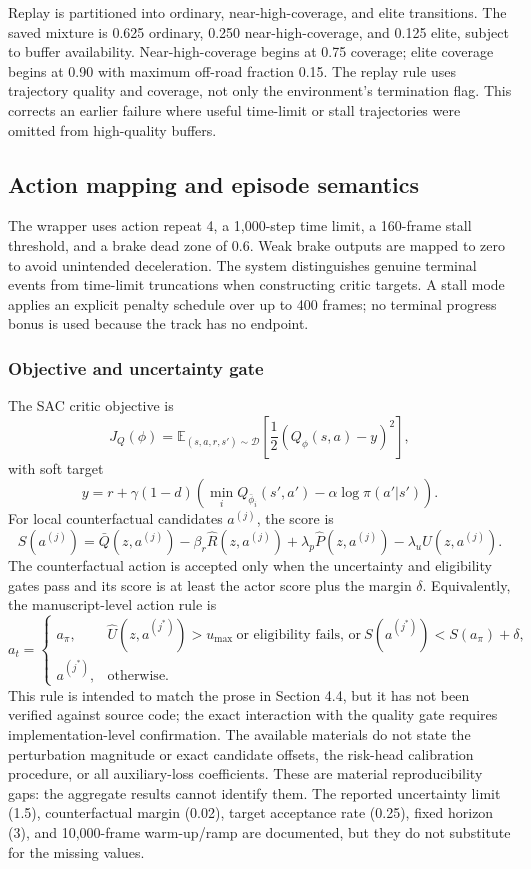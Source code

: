 \documentclass[11pt]{article}
\begin{document}
Replay is partitioned into ordinary, near-high-coverage, and elite
transitions. The saved mixture is 0.625 ordinary, 0.250
near-high-coverage, and 0.125 elite, subject to buffer availability.
Near-high-coverage begins at 0.75 coverage; elite coverage begins at
0.90 with maximum off-road fraction 0.15. The replay rule uses
trajectory quality and coverage, not only the environment's termination
flag. This corrects an earlier failure where useful time-limit or stall
trajectories were omitted from high-quality buffers.

\subsection{Action mapping and episode
semantics}\label{action-mapping-and-episode-semantics}

The wrapper uses action repeat 4, a 1,000-step time limit, a 160-frame
stall threshold, and a brake dead zone of 0.6. Weak brake outputs are
mapped to zero to avoid unintended deceleration. The system
distinguishes genuine terminal events from time-limit truncations when
constructing critic targets. A stall mode applies an explicit penalty
schedule over up to 400 frames; no terminal progress bonus is used
because the track has no endpoint.

\subsubsection{Objective and uncertainty
gate}\label{objective-and-uncertainty-gate}

The SAC critic objective is \[
J_Q(\phi)=\mathbb{E}_{(s,a,r,s')\sim\mathcal D}
\left[\frac12\left(Q_\phi(s,a)-y\right)^2\right],
\] with soft target \[
y=r+\gamma(1-d)\left(\min_i Q_{\bar\phi_i}(s',a')-\alpha\log\pi(a'|s')\right).
\] For local counterfactual candidates \(a^{(j)}\), the score is \[
S(a^{(j)})=\bar Q(z,a^{(j)})-\beta_r\hat R(z,a^{(j)})
+\lambda_p\hat P(z,a^{(j)})-\lambda_u\hat U(z,a^{(j)}).
\] The counterfactual action is accepted only when the uncertainty and
eligibility gates pass and its score is at least the actor score plus the
margin $\delta$. Equivalently, the manuscript-level action rule is
\[
a_t=\begin{cases}
 a_{\pi}, & \hat U(z,a^{(j^*)})>u_{\max}\ \text{or eligibility fails, or}\ S(a^{(j^*)})<S(a_\pi)+\delta,\\
 a^{(j^*)}, & \text{otherwise}.
\end{cases}
\]
This rule is intended to match the prose in Section 4.4, but it has not been
verified against source code; the exact interaction with the quality gate
requires implementation-level confirmation.
The available materials do not state the perturbation magnitude or exact
candidate offsets, the risk-head calibration procedure, or all auxiliary-loss
coefficients. These are material reproducibility gaps: the aggregate results
cannot identify them. The reported uncertainty limit (1.5), counterfactual
margin (0.02), target acceptance rate (0.25), fixed horizon (3), and 10,000-frame
warm-up/ramp are documented, but they do not substitute for the missing values.
\end{document}
